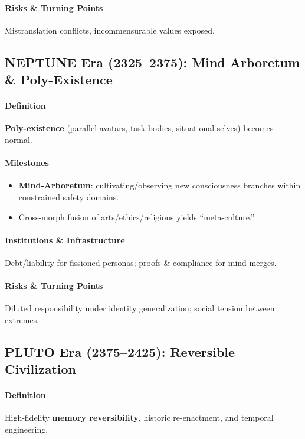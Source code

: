 \documentclass[11pt]{article}
\begin{document}
\paragraph{Risks \& Turning Points} Mistranslation conflicts, incommensurable values exposed.

\subsection{NEPTUNE Era (2325–2375): Mind Arboretum \& Poly-Existence}
\paragraph{Definition} \textbf{Poly-existence} (parallel avatars, task bodies, situational selves) becomes normal.

\paragraph{Milestones}
\begin{itemize}[noitemsep]
  \item \textbf{Mind-Arboretum}: cultivating/observing new consciousness branches within constrained safety domains.
  \item Cross-morph fusion of arts/ethics/religions yields ``meta-culture.''
\end{itemize}

\paragraph{Institutions \& Infrastructure} Debt/liability for fissioned personas; proofs \& compliance for mind-merges.

\paragraph{Risks \& Turning Points} Diluted responsibility under identity generalization; social tension between extremes.

\subsection{PLUTO Era (2375–2425): Reversible Civilization}
\paragraph{Definition} High-fidelity \textbf{memory reversibility}, historic re-enactment, and temporal engineering.
\end{document}
